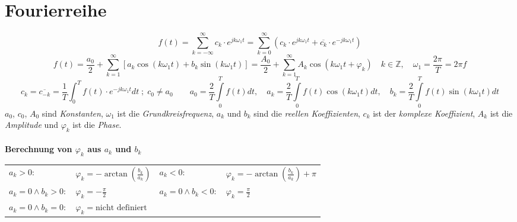 \newpage
\section{Fourierreihe}
  	$$\boxed{f(t) = \sum\limits_{k = -\infty}^{\infty} c_k \cdot e^{j k \omega_1
  	t}}= \boxed{\sum\limits_{k = 0}^{\infty} \left(c_k \cdot e^{j k \omega_1
  	t} + \overline{c_k} \cdot e^{-j k \omega_1t}\right)}$$
  	$$\boxed{f(t) = \frac{a_0}{2} + \sum\limits_{k=1}^{\infty} \left[a_k \cos(k
  	\omega_1 t) + b_k \sin(k \omega_1 t)\right]}=\boxed{\frac{A_0}{2} +
  	\sum\limits_{k=1}^{\infty} A_k \cos(k \omega_1 t + \varphi_k)} \quad k\in
  	\mathbb{Z}, \quad \omega_1=\frac{2 \pi}{T}=2 \pi f$$	
	$$\boxed{c_k=\overline{c_{-k}}=\frac{1}{T}\int_0^T{f(t)\cdot
	e^{-jk\omega_1
	t}dt} \; ; \; c_0 \neq a_0} \qquad \boxed{a_0 = \frac{2}{T}\int\limits_0^{T}
	f(t)dt, \quad a_k = \frac{2}{T}\int\limits_0^{T} f(t)\cos(k \omega_1 t) dt, \quad b_k =
	\frac{2}{T}\int\limits_0^{T} f(t)\sin(k \omega_1 t) dt}$$
	$a_0$, $c_0$, $A_0$ sind \textit{Konstanten}, $\omega_1$ ist die
	\textit{Grundkreisfrequenz}, $a_k$ und $b_k$ sind die \textit{reellen
	Koeffizienten}, $c_k$ ist der \textit{komplexe Koeffizient}, $A_k$ ist die
	\textit{Amplitude} und $\varphi_k$ ist die \textit{Phase}.\\
	\\

	\textbf{Berechnung von $\varphi_k$ aus $a_k$ und $b_k$}\\
	\begin{tabular}{p{4cm}p{4cm}p{3cm}p{3.5cm}}
		$a_k> 0:$ & $\varphi_k = -\arctan(\frac{b_k}{a_k})$ &
		$a_k<0:$ &	$\varphi_k = -\arctan(\frac{b_k}{a_k}) + \pi$\\
		$a_k = 0 \wedge b_k > 0:$ &	$\varphi_k = -\frac{\pi}{2}$ &
		$a_k = 0 \wedge b_k < 0:$ &	$\varphi_k = \frac{\pi}{2}$\\
		$a_k = 0 \wedge b_k = 0:$ &	$\varphi_k = \text{nicht definiert}$
	\end{tabular}

